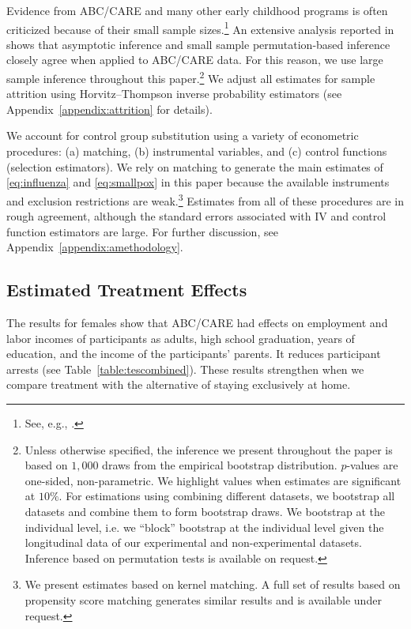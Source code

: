 Evidence from ABC/CARE and many other early childhood programs is often criticized because of their small sample sizes.\footnote{See, e.g., \cite{Murray_2013_GivingKids_JJHBOOK}.} An extensive analysis reported in \citet{Campbell_Conti_etal_2014_EarlyChildhoodInvestments} shows that asymptotic inference and small sample permutation-based inference closely agree when applied to ABC/CARE data. For this reason, we use large sample inference throughout this paper.\footnote{Unless otherwise specified, the inference we present throughout the paper is based on $1,000$ draws from the empirical bootstrap distribution. $p$-values are one-sided, non-parametric. We highlight values when estimates are significant at $10\%$. For estimations using combining different datasets, we bootstrap all datasets and combine them to form bootstrap draws. We bootstrap at the individual level, i.e. we ``block'' bootstrap at the individual level given the longitudinal data of our experimental and non-experimental datasets. Inference based on permutation tests is available on request.} We adjust all estimates for sample attrition using Horvitz--Thompson \citeyearpar{Horvitz_Thompson_1952_JASA} inverse probability estimators (see Appendix~\ref{appendix:attrition} for details).

We account for control group substitution using a variety of econometric procedures: (a) matching, (b) instrumental variables, and (c) control functions (selection estimators). We rely on matching to generate the main estimates of \eqref{eq:influenza} and \eqref{eq:smallpox} in this paper because the available instruments and exclusion restrictions are weak.\footnote{We present estimates based on kernel matching. A full set of results based on propensity score matching generates similar results and is available under request.} Estimates from all of these procedures are in rough agreement, although the standard errors associated with IV and control function estimators are large. For further discussion, see Appendix~\ref{appendix:amethodology}.

\subsection{Estimated Treatment Effects}

The results for females show that ABC/CARE had effects on employment and labor incomes of participants as adults, high school graduation, years of education, and the income of the participants' parents. It reduces participant arrests (see Table~\ref{table:tescombined}). These results strengthen when we compare treatment with the alternative of staying exclusively at home.

